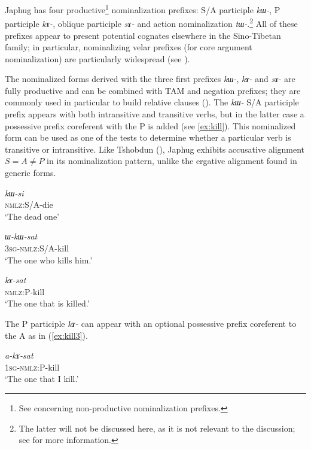\documentclass[oneside,a4paper,11pt]{article}
\newcommand{\ipa}[1]{\textit{\phon\mbox{#1}}} %
\newcommand{\refb}[1]{(\ref{#1})}
\begin{document}
Japhug has four productive\footnote{See \citet[4-6]{jacques14antipassive} concerning non-productive nominalization prefixes.} nominalization prefixes: S/A participle \ipa{kɯ-},   P participle \ipa{kɤ-},   oblique participle \ipa{sɤ-}  and   action nominalization \ipa{tɯ-}.\footnote{The latter will not be discussed here, as it is not relevant to the discussion; see \citet[6-9]{jacques14antipassive}  for more information.}   All of these prefixes appear to present potential cognates elsewhere in the Sino-Tibetan family; in particular, nominalizing velar prefixes (for core argument nominalization) are particularly widespread (see \citealt{konnerth09nmlz}). 

 The nominalized forms derived with the three first prefixes \ipa{kɯ-}, \ipa{kɤ}- and \ipa{sɤ}- are fully productive and can be combined with TAM and negation prefixes; they are commonly used in particular to build relative clauses (\citealt{jacques16relatives}).  The \ipa{kɯ-} S/A participle prefix appears with both intransitive and transitive verbs, but in the latter case a possessive prefix coreferent with the P is added (see \ref{ex:kill}). This nominalized form can be used as one of the tests to determine whether a particular verb is transitive or intransitive. Like Tshobdun (\citealt{jackson03caodeng}),  Japhug exhibits accusative alignment $S=A\neq P$ in its nominalization pattern, unlike the ergative alignment found in generic forms. 

 \begin{exe}
\ex \label{ex:die}
\gll \ipa{kɯ-si}    \\
  \textsc{nmlz}:S/A-die \\
 \glt  `The dead one'
 
\ex \label{ex:kill}
\gll \ipa{ɯ-kɯ-sat}    \\
  \textsc{3sg}-\textsc{nmlz}:S/A-kill \\
 \glt  `The one who kills him.'
 

\ex \label{ex:kill2}
\gll \ipa{kɤ-sat}    \\
   \textsc{nmlz}:P-kill \\
 \glt  `The one that is killed.'
 \end{exe}
 
  The P participle \ipa{kɤ-} can appear with an optional possessive prefix coreferent to the A as in \refb{ex:kill3}.
  
  \begin{exe}
\ex \label{ex:kill3}
\gll \ipa{a-kɤ-sat}    \\
   \textsc{1sg-nmlz}:P-kill \\
 \glt  `The one that I kill.'
 \end{exe} 
 
\end{document}
